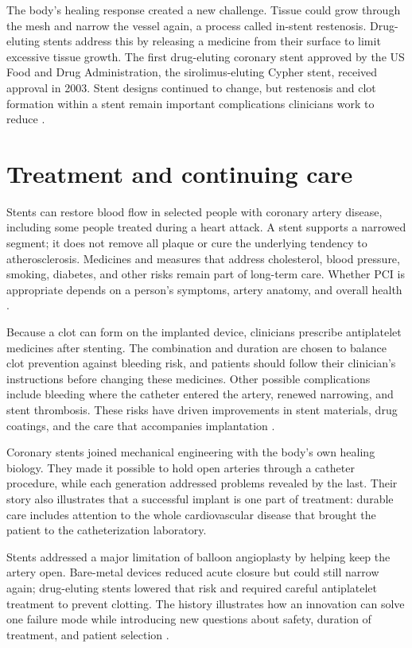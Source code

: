 \documentclass[12pt,oneside]{book}
\begin{document}
The body's healing response created a new challenge. Tissue could grow
through the mesh and narrow the vessel again, a process called in-stent
restenosis. Drug-eluting stents address this by releasing a medicine from
their surface to limit excessive tissue growth. The first drug-eluting
coronary stent approved by the US Food and Drug Administration, the
sirolimus-eluting Cypher stent, received approval in 2003. Stent designs
continued to change, but restenosis and clot formation within a stent remain
important complications clinicians work to reduce
\cite{coronaryPCIHistory,fdaCypherStent}.

\section{Treatment and continuing care}
Stents can restore blood flow in selected people with coronary artery
disease, including some people treated during a heart attack. A stent
supports a narrowed segment; it does not remove all plaque or cure the
underlying tendency to atherosclerosis. Medicines and measures that address
cholesterol, blood pressure, smoking, diabetes, and other risks remain part
of long-term care. Whether PCI is appropriate depends on a person's symptoms,
artery anatomy, and overall health \cite{ahaCoronaryStent,coronaryPCIHistory}.

Because a clot can form on the implanted device, clinicians prescribe
antiplatelet medicines after stenting. The combination and duration are
chosen to balance clot prevention against bleeding risk, and patients
should follow their clinician's instructions before changing these
medicines. Other possible complications include bleeding where the catheter
entered the artery, renewed narrowing, and stent thrombosis. These risks
have driven improvements in stent materials, drug coatings, and the care
that accompanies implantation \cite{ahaCoronaryStent,coronaryPCIHistory}.

Coronary stents joined mechanical engineering with the body's own healing
biology. They made it possible to hold open arteries through a catheter
procedure, while each generation addressed problems revealed by the last.
Their story also illustrates that a successful implant is one part of
treatment: durable care includes attention to the whole cardiovascular
disease that brought the patient to the catheterization laboratory.

Stents addressed a major limitation of balloon angioplasty by helping keep the
artery open. Bare-metal devices reduced acute closure but could still narrow
again; drug-eluting stents lowered that risk and required careful antiplatelet
treatment to prevent clotting. The history illustrates how an innovation can
solve one failure mode while introducing new questions about safety, duration
of treatment, and patient selection
\cite{coronaryStentInception,fdaCypherStent}.
\end{document}
